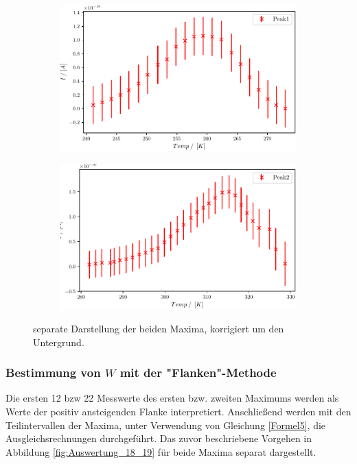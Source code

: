 \begin{figure}
\centering
\begin{subfigure}{.5\textwidth}
	\centering
	\includegraphics[width=1\textwidth]{build/2_Temp_current_peak.pdf}
	\caption{}
	\label{fig:Auswertung_16}
\end{subfigure}%
\begin{subfigure}{.5\textwidth}
	\centering
	\includegraphics[width=1\textwidth]{build/2_Temp_current_peak2.pdf}
	\caption{}
	\label{fig:Auswertung_17}
\end{subfigure}
\caption{separate Darstellung der beiden Maxima, korrigiert um den Untergrund.}
\label{fig:Auswertung_16_17}
\end{figure}

\subsubsection{Bestimmung von $W$ mit der "Flanken"-Methode}

Die ersten 12 bzw 22 Messwerte des ersten bzw. zweiten Maximums werden als Werte der positiv ansteigenden Flanke interpretiert. Anschließend werden mit den Teilintervallen der Maxima, unter Verwendung von Gleichung \eqref{Formel5}, die Ausgleichsrechnungen durchgeführt. Das zuvor beschriebene Vorgehen in Abbildung \ref{fig:Auswertung_18_19} für beide Maxima separat dargestellt.

